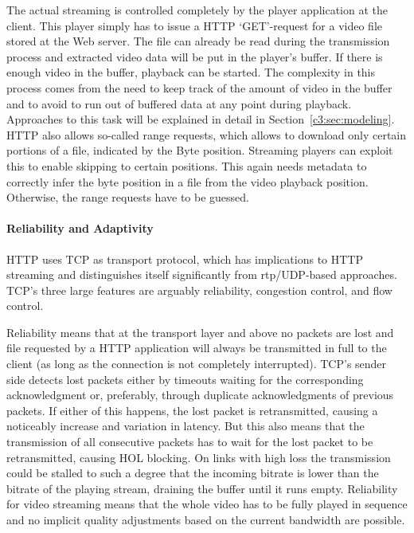 The actual streaming is controlled completely by the player application at the client. This player simply has to issue a \gls{HTTP} `GET'-request for a video file stored at the Web server. The file can already be read during the transmission process and extracted video data will be put in the player's buffer. If there is enough video in the buffer, playback can be started. The complexity in this process comes from the need to keep track of the amount of video in the buffer and to avoid to run out of buffered data at any point during playback. Approaches to this task will be explained in detail in Section~\ref{c3:sec:modeling}. \gls{HTTP} also allows so-called range requests, which allows to download only certain portions of a file, indicated by the Byte position. Streaming players can exploit this to enable skipping to certain positions. This again needs metadata to correctly infer the byte position in a file from the video playback position. Otherwise, the range requests have to be guessed. 


\paragraph{Reliability and Adaptivity}

\gls{HTTP} uses \gls{TCP} as transport protocol, which has implications to \gls{HTTP} streaming and distinguishes itself significantly from \gls{rtp}/\gls{UDP}-based approaches. \gls{TCP}'s three large features are arguably reliability, congestion control, and flow control.

Reliability means that at the transport layer and above no packets are lost and file requested by a \gls{HTTP} application will always be transmitted in full to the client (as long as the connection is not completely interrupted). \gls{TCP}'s sender side detects lost packets either by timeouts waiting for the corresponding acknowledgment or, preferably, through duplicate acknowledgments of previous packets. If either of this happens, the lost packet is retransmitted, causing a noticeably increase and variation in latency. But this also means that the transmission of all consecutive packets has to wait for the lost packet to be retransmitted, causing \gls{HOL} blocking. On links with high loss the transmission could be stalled to such a degree that the incoming bitrate is lower than the bitrate of the playing stream, draining the buffer until it runs empty. 
Reliability for video streaming means that the whole video has to be fully played in sequence and no implicit quality adjustments based on the current bandwidth are possible.

